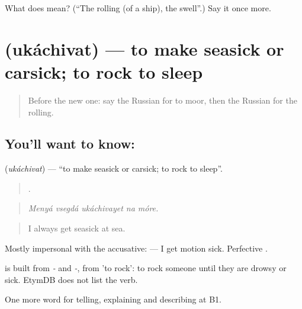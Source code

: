 \begin{tcolorbox}[breakable,colback=teal!4,colframe=teal!35!black,title={Before you move on}]
What does  mean? (\textquotedblleft{}The rolling (of a ship), the swell\textquotedblright{}.) Say it once more.
\end{tcolorbox}
\section[\texorpdfstring{\ru{укачивать} (ukáchivat)}{укачивать (ukáchivat)}]{ (ukáchivat) — to make seasick or carsick; to rock to sleep}

\label{lesson:RU-C425-ukachivat}



\begin{quote}
Before the new one: say the Russian for to moor, then the Russian for the rolling.
\end{quote}

\subsection*{You'll want to know: }
\textbf{} (\emph{ukáchivat}) — \textquotedblleft{}to make seasick or carsick; to rock to sleep\textquotedblright{}.

\begin{quote}
    .
\end{quote}

\begin{quote}
\emph{Menyá vsegdá ukáchivayet na móre.}
\end{quote}

\begin{quote}
I always get seasick at sea.
\end{quote}

Mostly impersonal with the accusative: \emph{ } — I get motion sick. Perfective \emph{}.

\begin{cousinweb}
\emph{} is built from \emph{-} and \emph{-}, from \emph{} 'to rock': to rock someone until they are drowsy or sick. EtymDB does not list the verb.
\end{cousinweb}

\begin{grammarlens}[title={What you've built}]
One more word for telling, explaining and describing at B1.
\end{grammarlens}

